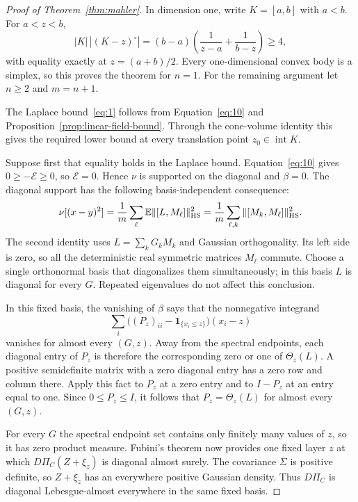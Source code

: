 \begin{proof}[Proof of Theorem~\ref{thm:mahler}]
In dimension one, write $K=[a,b]$ with $a<b$. For $a<z<b$,
\[
 |K|\,|(K-z)^\circ|
 =(b-a)\left(\frac1{z-a}+\frac1{b-z}\right)\ge4,
\]
with equality exactly at $z=(a+b)/2$. Every one-dimensional convex
body is a simplex, so this proves the theorem for $n=1$.
For the remaining argument let $n\ge2$ and $m=n+1$.

The Laplace bound~\eqref{eq:1} follows from Equation~\eqref{eq:10} and
Proposition~\ref{prop:linear-field-bound}.  Through the cone-volume identity
this gives
the required lower bound at every translation point
\(z_0\in\operatorname{int}K\).

Suppose first that equality holds in the Laplace bound.  Equation~\eqref{eq:10}
gives \(0\ge-\mathcal E\ge0\), so \(\mathcal E=0\).  Hence \(\nu\)
is supported on the diagonal and \(\beta=0\).  The diagonal support has
the following basis-independent consequence:
\[
 \nu[(x-y)^2]
   =\frac1m\sum_\ell\mathbb E\|[L,M_\ell]\|_{\rm HS}^2
   =\frac1m\sum_{\ell,k}\|[M_k,M_\ell]\|_{\rm HS}^2.
\]
The second identity uses \(L=\sum_kG_kM_k\) and Gaussian orthogonality.
Its left side is zero, so all the deterministic real symmetric matrices
\(M_\ell\) commute.  Choose a single orthonormal basis that diagonalizes
them simultaneously; in this basis \(L\) is diagonal for every \(G\).
Repeated eigenvalues do not affect this conclusion.

In this fixed basis, the vanishing of \(\beta\) says that the
nonnegative integrand
\[
 \sum_i\bigl((P_z)_{ii}-\mathbf1_{\{x_i\le z\}}\bigr)(x_i-z)
\]
vanishes for almost every \((G,z)\).  Away from the spectral endpoints,
each diagonal entry of \(P_z\) is therefore the corresponding zero or
one of \(\Theta_z(L)\).  A positive semidefinite matrix with a zero
diagonal entry has a zero row and column there.  Apply this fact to
\(P_z\) at a zero entry and to \(I-P_z\) at an entry equal to one.
Since \(0\le P_z\le I\), it follows that
\(P_z=\Theta_z(L)\) for almost every \((G,z)\).

For every \(G\) the spectral endpoint set contains only finitely many
values of \(z\), so it has zero product measure.  Fubini's theorem now
provides one fixed layer \(z\) at which
\(D\Pi_C(Z+\xi_z)\) is diagonal almost surely.  The covariance
\(\Sigma\) is positive definite, so \(Z+\xi_z\) has an everywhere
positive Gaussian density.  Thus \(D\Pi_C\) is diagonal Lebesgue-almost
everywhere in the same fixed basis.


\end{proof}
